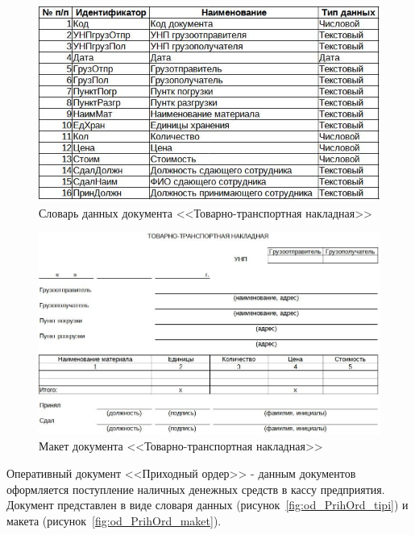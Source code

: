 \documentclass[12pt, a4paper, simple]{eskdtext}
\begin{document}
    \begin{figure}[p!h]
        \centering
        \includegraphics[]
            {_docs/ОД_ТТН_типы.jpg}
        \caption{Словарь данных документа <<Товарно-транспортная накладная>>}
        \label{fig:od_TTH_tipi}
    \end{figure}

    \begin{figure}[p!h]
        \centering
        \includegraphics[width=16cm]
            {_docs/ОД_ТТН_макет.jpg}
        \caption{Макет документа <<Товарно-транспортная накладная>>}
        \label{fig:od_TTH_maket}
    \end{figure}

    Оперативный документ <<Приходный ордер>> - данным документов оформляется
    поступление наличных денежных средств в кассу предприятия.
    Документ представлен в виде словаря данных (рисунок~\ref{fig:od_PrihOrd_tipi})
    и макета (рисунок~\ref{fig:od_PrihOrd_maket}).
\end{document}
